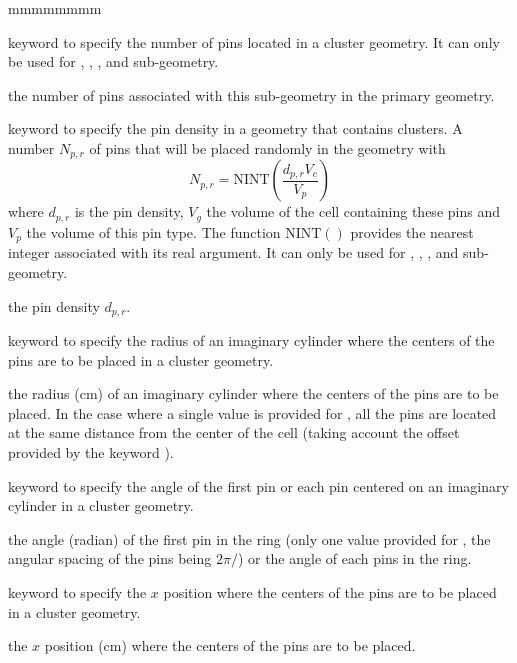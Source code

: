 \begin{ListeDeDescription}{mmmmmmmm}
\item[\moc{NPIN}] keyword to specify the number of pins located in a cluster geometry. It can only be used for , , ,  and  sub-geometry.

\item[\dusa{npins}] the number of pins associated with this sub-geometry in the primary geometry. 

\item[\moc{DPIN}] keyword to specify the pin density in a geometry that contains clusters. A number $N_{p,r}$ of pins that will be placed randomly in the geometry with
$$
N_{p,r}=\textrm{NINT}\left(\frac{d_{p,r}V_{c}}{V_{p}}\right)
$$
where $d_{p,r}$ is the pin density, $V_{g}$ the volume of the cell containing these pins and$V_{p}$ the volume of this pin type. The function $\textrm{NINT}()$ provides the nearest integer associated with its real argument. It can only be used for , , ,  and  sub-geometry.

\item[\dusa{dpins}] the pin density $d_{p,r}$. 

\item[\moc{RPIN}] keyword to specify the radius of an imaginary cylinder where the centers of the pins are to be placed in a cluster geometry.

\item[\dusa{rpins}] the radius (cm) of an imaginary cylinder where the centers of the pins are to be placed. In the case where a single value is provided for , all the pins are located at the same distance from the center of the cell (taking account the offset provided by the keyword ). 

\item[\moc{APIN}] keyword to specify the angle of the first pin or each pin centered on an imaginary cylinder in a cluster geometry. 

\item[\dusa{apins}] the angle (radian) of the first pin in the ring (only one value provided for , the angular spacing of the pins being $2\pi/$) or the angle of each pins in the ring.

\item[\moc{CPINX}] keyword to specify the $x$ position where the centers of the pins are
to be placed in a cluster geometry. 

\item[\dusa{xpins}] the $x$ position (cm) where the centers of the pins are to be
placed.


\end{ListeDeDescription}
